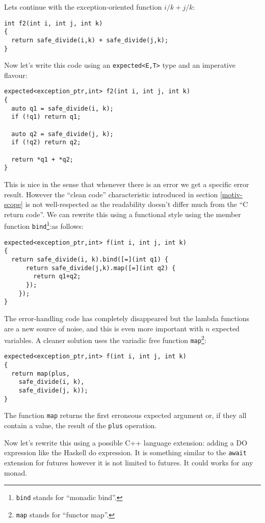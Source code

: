 \documentclass[a4paper,10pt]{article}
\newcommand{\cpp}[1]{\lstinline{#1}}
\begin{document}
Lets continue with the exception-oriented function $i/k + j/k$:

\begin{lstlisting}
int f2(int i, int j, int k)
{
  return safe_divide(i,k) + safe_divide(j,k);
}
\end{lstlisting}

\noindent
Now let's write this code using an \cpp{expected<E,T>} type and an imperative flavour:

\begin{lstlisting}
expected<exception_ptr,int> f2(int i, int j, int k)
{
  auto q1 = safe_divide(i, k);
  if (!q1) return q1;

  auto q2 = safe_divide(j, k);
  if (!q2) return q2;

  return *q1 + *q2;
}
\end{lstlisting}

This is nice in the sense that whenever there is an error we get a specific error result. However the ``clean code'' characteristic introduced in section \ref{motiv-scope} is not well-respected as the readability doesn't differ much from the ``C return code''. We can rewrite this using a functional style using the member function \cpp{bind}\footnote{\cpp{bind} stands for ``monadic bind''.}:as follows:

\begin{lstlisting}
expected<exception_ptr,int> f(int i, int j, int k)
{
  return safe_divide(i, k).bind([=](int q1) {
      return safe_divide(j,k).map([=](int q2) {
        return q1+q2;
      });
    });
}
\end{lstlisting}

The error-handling code has completely disappeared but the lambda functions are a new source of noise, and this is even more important with $n$ expected variables. A cleaner solution uses the variadic free function \cpp{map}\footnote{\cpp{map} stands for ``functor map''.}:

\begin{lstlisting}
expected<exception_ptr,int> f(int i, int j, int k)
{
  return map(plus,
    safe_divide(i, k), 
    safe_divide(j, k));
}
\end{lstlisting}

The function \cpp{map} returns the first erroneous expected argument or, if they all contain a value, the result of the \cpp{plus} operation.


Now let's rewrite this using a possible C++ language extension: adding a DO expression like the Haskell do expression. It is something similar  to the \cpp{await} extension for futures however it is not limited to futures. It could works for any monad.   
\end{document}
